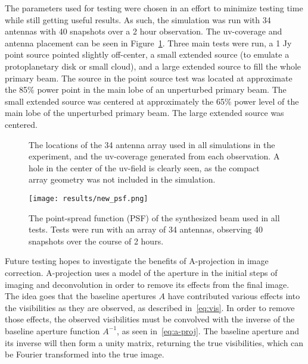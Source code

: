 \documentclass[11pt]{article}
\begin{document}
The parameters used for testing were chosen in an effort to minimize testing
time while still getting useful results. As such, the simulation was run
with 34 antennas with 40 snapshots over a 2 hour observation. The uv-coverage
and antenna placement can be seen in Figure~\ref{fig:params}. Three main tests
were run, a 1 Jy point source pointed slightly off-center, a small extended 
source (to emulate a protoplanetary disk or small cloud), and a large extended 
source to fill the whole primary beam. The source in the point source test was
located at approximate the 85$\%$ power point in the main lobe of an 
unperturbed primary beam. The small extended source was centered at 
approximately the 65$\%$ power level of the main lobe of the unperturbed 
primary beam. The large extended source was centered.

\begin{figure}
    \centering
    \quad
    \caption{
        The locations of the 34 antenna array used in all simulations in the
        experiment, and the uv-coverage generated from each observation. A
        hole in the center of the uv-field is clearly seen, as the compact 
        array geometry was not included in the simulation.
    }
    \label{fig:params}
\end{figure}

\begin{figure}
    \centering
    \texttt{[image: results/new\_psf.png]}
    \caption{
        The point-spread function (PSF) of the synthesized beam used in all 
        tests.  Tests were run with an array of 34 antennas, observing 40 
        snapshots over the course of 2 hours.
    }
    \label{fig:psf}
\end{figure}

Future testing hopes to investigate the benefits of A-projection in image 
correction.
A-projection uses a model of the aperture in the initial steps of imaging and 
deconvolution in order to remove its effects from the final image. The idea 
goes that the baseline apertures $A$ have contributed various effects into the 
visibilities as they are observed, as described in~\eqref{eq:vis}. In order to 
remove those effects, the observed visibilities must be convolved with the 
inverse of the baseline aperture function $A^{-1}$, as seen 
in~\eqref{eq:a-proj}. The baseline aperture and its inverse will then form a 
unity matrix, returning the true visibilities, which can be Fourier transformed 
into the true image.
\end{document}
